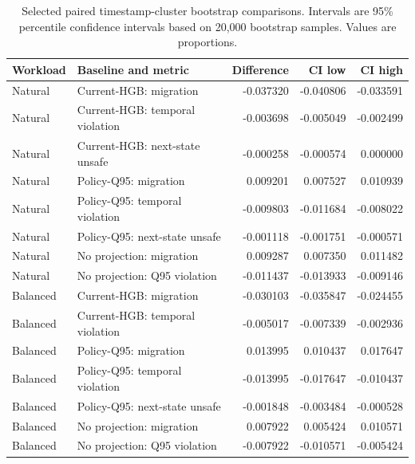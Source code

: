 \begin{table}[t]
\centering
\caption{Selected paired timestamp-cluster bootstrap comparisons.
Intervals are 95\% percentile confidence intervals based on 20,000
bootstrap samples. Values are proportions.}
\label{tab:bootstrap-results}
\begin{tabular}{llrrr}
\toprule
Workload &
Baseline and metric &
Difference &
CI low &
CI high \\
\midrule
Natural &
Current-HGB: migration &
-0.037320 &
-0.040806 &
-0.033591 \\

Natural &
Current-HGB: temporal violation &
-0.003698 &
-0.005049 &
-0.002499 \\

Natural &
Current-HGB: next-state unsafe &
-0.000258 &
-0.000574 &
0.000000 \\

Natural &
Policy-Q95: migration &
0.009201 &
0.007527 &
0.010939 \\

Natural &
Policy-Q95: temporal violation &
-0.009803 &
-0.011684 &
-0.008022 \\

Natural &
Policy-Q95: next-state unsafe &
-0.001118 &
-0.001751 &
-0.000571 \\

Natural &
No projection: migration &
0.009287 &
0.007350 &
0.011482 \\

Natural &
No projection: Q95 violation &
-0.011437 &
-0.013933 &
-0.009146 \\
\midrule
Balanced &
Current-HGB: migration &
-0.030103 &
-0.035847 &
-0.024455 \\

Balanced &
Current-HGB: temporal violation &
-0.005017 &
-0.007339 &
-0.002936 \\

Balanced &
Policy-Q95: migration &
0.013995 &
0.010437 &
0.017647 \\

Balanced &
Policy-Q95: temporal violation &
-0.013995 &
-0.017647 &
-0.010437 \\

Balanced &
Policy-Q95: next-state unsafe &
-0.001848 &
-0.003484 &
-0.000528 \\

Balanced &
No projection: migration &
0.007922 &
0.005424 &
0.010571 \\

Balanced &
No projection: Q95 violation &
-0.007922 &
-0.010571 &
-0.005424 \\
\bottomrule
\end{tabular}
\end{table}

